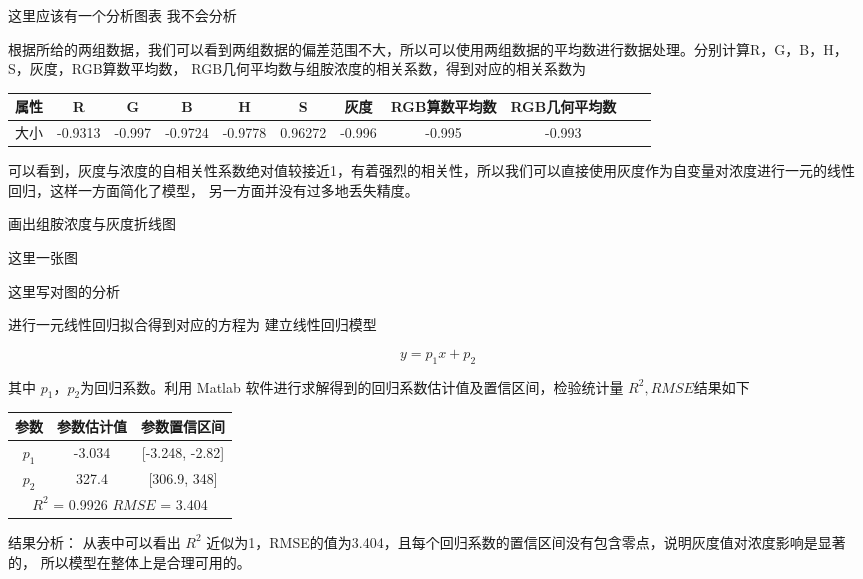     这里应该有一个分析图表 我不会分析

    根据所给的两组数据，我们可以看到两组数据的偏差范围不大，所以可以使用两组数据的平均数进行数据处理。分别计算R，G，B，H，S，灰度，RGB算数平均数，
    RGB几何平均数与组胺浓度的相关系数，得到对应的相关系数为
    \begin{table}[H]
        \centering  
        \begin{tabular}{|c|c|c|c|c|c|c|c|c|c|c|}
        \hline
            属性 & R & G & B & H & S & 灰度 & RGB算数平均数 & RGB几何平均数 \\
        \hline
            大小 & -0.9313 & -0.997 & -0.9724 & -0.9778 & 0.96272 & -0.996 & -0.995 & -0.993 \\
        \hline
        \end{tabular}
    \end{table}
         
    可以看到，灰度与浓度的自相关性系数绝对值较接近1，有着强烈的相关性，所以我们可以直接使用灰度作为自变量对浓度进行一元的线性回归，这样一方面简化了模型，
    另一方面并没有过多地丢失精度。

    画出组胺浓度与灰度折线图

    这里一张图

    这里写对图的分析

    进行一元线性回归拟合得到对应的方程为
    建立线性回归模型

    $$ y = p_1 x + p_2$$

    其中 $p_{1}，p_{2}$为回归系数。利用 Matlab 软件进行求解得到的回归系数估计值及置信区间，检验统计量 $R^2, RMSE $结果如下

    \begin{table}[H]
        \centering
        \begin{tabular}{|c|c|c|}
            \hline
            参数     & 参数估计值  & 参数置信区间        \\ 
            \hline
            $p_1$  & -3.034 & [-3.248, -2.82] \\
            \hline
            $p_2$  & 327.4  & [306.9, 348]   \\
            \hline
            \multicolumn{3}{|c|}{$R^2$ = 0.9926 $RMSE$ = 3.404}  \\                                            
            \hline
        \end{tabular}
        \end{table}

    结果分析： 从表中可以看出 $R^2$ 近似为1，RMSE的值为3.404，且每个回归系数的置信区间没有包含零点，说明灰度值对浓度影响是显著的，
    所以模型在整体上是合理可用的。


